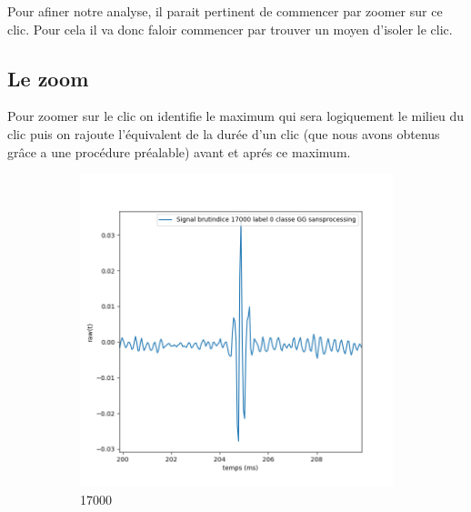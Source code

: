 Pour afiner notre analyse, il parait pertinent de commencer par zoomer sur ce clic.
Pour cela il va donc faloir commencer par trouver un moyen d'isoler le clic.

\hypertarget{Le-zoom}{%
\subsection{Le zoom}
\label{Le-zoom}}

Pour zoomer sur le clic on identifie le maximum qui sera logiquement le milieu du clic puis on rajoute l'équivalent de la durée d'un clic (que nous avons obtenus grâce a une procédure préalable) avant et aprés ce maximum.


\begin{figure}[!h]
  \centering
  \begin{subfigure}[b]{0.3\textwidth}
    \includegraphics[width=\textwidth]{./images/indice17000Spectro1Dlabel0classeGGsansprocessingaveczoom.png}
    \caption{17000}
  \end{subfigure}
  \begin{subfigure}[b]{0.3\textwidth}

\end{subfigure}
\end{figure}
